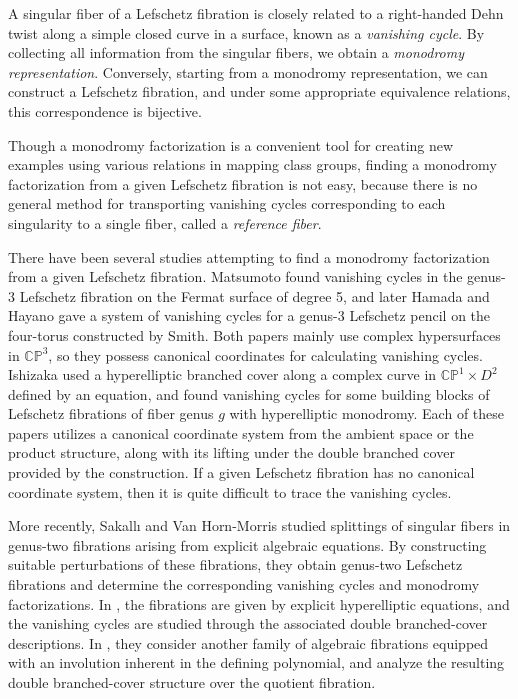 \documentclass[10pt,a4paper,reqno]{amsart}
\theoremstyle{definition}
\numberwithin{equation}{section}
\numberwithin{figure}{section}
\newcommand{\CP}{\mathbb{CP}}
\begin{document}
A singular fiber of a Lefschetz fibration is closely related to a right-handed Dehn twist along a simple closed curve in a surface, known as a \textit{vanishing cycle}.
By collecting all information from the singular fibers, we obtain a \textit{monodromy representation}.
Conversely, starting from a monodromy representation, we can construct a Lefschetz fibration,
and under some appropriate equivalence relations, this correspondence is bijective.

Though a monodromy factorization is a convenient tool for creating new examples using various relations in mapping class groups,
finding a monodromy factorization from a given Lefschetz fibration is not easy, because there is no general method for transporting vanishing cycles corresponding to each singularity to a single fiber,
called a \textit{reference fiber}.

There have been several studies attempting to find a monodromy factorization from a given Lefschetz fibration.
Matsumoto \cite{M1} found vanishing cycles in the genus-3 Lefschetz fibration on the Fermat surface of degree 5,
and later Hamada and Hayano \cite{HH} gave a system of vanishing cycles for a genus-3 Lefschetz pencil on the four-torus constructed by Smith.
Both papers mainly use complex hypersurfaces in $\CP^3$, so they possess canonical coordinates for calculating vanishing cycles.
Ishizaka \cite{I} used a hyperelliptic branched cover along a complex curve in $\CP^1 \times D^2$ defined by an equation,
and found vanishing cycles for some building blocks of Lefschetz fibrations of fiber genus $g$ with hyperelliptic monodromy.
Each of these papers utilizes a canonical coordinate system from the ambient space or the product structure,
along with its lifting under the double branched cover provided by the construction.
If a given Lefschetz fibration has no canonical coordinate system, then it is quite difficult to trace the vanishing cycles.

More recently, Sakallı and Van Horn-Morris \cite{SV1,SV2} studied splittings of singular fibers in genus-two fibrations arising from explicit algebraic equations. 
By constructing suitable perturbations of these fibrations, they obtain genus-two Lefschetz fibrations and determine the corresponding vanishing cycles and monodromy factorizations. 
In \cite{SV1}, the fibrations are given by explicit hyperelliptic equations, and the vanishing cycles are studied through the associated double branched-cover descriptions. 
In \cite{SV2}, they consider another family of algebraic fibrations equipped with an involution inherent in the defining polynomial, and analyze the resulting double branched-cover structure over the quotient fibration.
\end{document}
